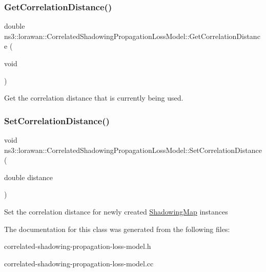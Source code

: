 \subsubsection{\texorpdfstring{Get\+Correlation\+Distance()}{GetCorrelationDistance()}}
{\footnotesize\ttfamily double ns3\+::lorawan\+::\+Correlated\+Shadowing\+Propagation\+Loss\+Model\+::\+Get\+Correlation\+Distance (\begin{DoxyParamCaption}\item[{void}]{ }\end{DoxyParamCaption})}

Get the correlation distance that is currently being used. \mbox{\label{classns3_1_1lorawan_1_1CorrelatedShadowingPropagationLossModel_a1553b2a1935dc8e59d3326bee538736c}} 
\subsubsection{\texorpdfstring{Set\+Correlation\+Distance()}{SetCorrelationDistance()}}
{\footnotesize\ttfamily void ns3\+::lorawan\+::\+Correlated\+Shadowing\+Propagation\+Loss\+Model\+::\+Set\+Correlation\+Distance (\begin{DoxyParamCaption}\item[{double}]{distance }\end{DoxyParamCaption})}

Set the correlation distance for newly created \hyperlink{classns3_1_1lorawan_1_1CorrelatedShadowingPropagationLossModel_1_1ShadowingMap}{Shadowing\+Map} instances 

The documentation for this class was generated from the following files\+:\begin{DoxyCompactItemize}
\item 
correlated-\/shadowing-\/propagation-\/loss-\/model.\+h\item 
correlated-\/shadowing-\/propagation-\/loss-\/model.\+cc\end{DoxyCompactItemize}

